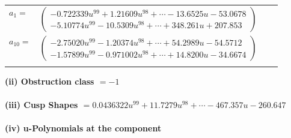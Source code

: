 \documentclass[1p]{elsarticle_modified}
\theoremstyle{definition}
\begin{document}
\begin{tabular}{m{7pt} m{180pt} m{7pt} m{180pt} }
\flushright $a_{1}=$&$\begin{pmatrix}-0.722339 u^{99}+1.21609 u^{98}+\cdots-13.6525 u-53.0678\\-5.10774 u^{99}-10.5309 u^{98}+\cdots+348.261 u+207.853\end{pmatrix}$ \\
\flushright $a_{10}=$&$\begin{pmatrix}-2.75020 u^{99}-1.20374 u^{98}+\cdots+54.2989 u-54.5712\\-1.57899 u^{99}-0.971002 u^{98}+\cdots+14.8200 u-34.6674\end{pmatrix}$\\&\end{tabular}
\flushleft \textbf{(ii) Obstruction class $= -1$}\\~\\
\flushleft \textbf{(iii) Cusp Shapes $= 0.0436322 u^{99}+11.7279 u^{98}+\cdots-467.357 u-260.647$}\\~\\
\newpage\renewcommand{\arraystretch}{1}
\flushleft \textbf{(iv) u-Polynomials at the component}\newline \\
\end{document}
